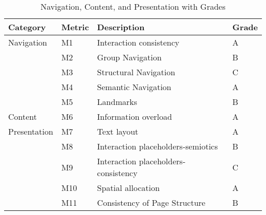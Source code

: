 \begin{table}[ht]
	\centering
	\caption{Navigation, Content, and Presentation with Grades}
	\begin{tabular}{|l|l|l|l|}
		\hline
		\textbf{Category} & \textbf{Metric} & \textbf{Description} & \textbf{Grade} \\
		\hline
		Navigation & M1 & Interaction consistency & A \\
		\hline
		& M2 & Group Navigation & B \\
		\hline
		& M3 & Structural Navigation & C \\
		\hline
		& M4 & Semantic Navigation & A \\
		\hline
		& M5 & Landmarks & B \\
		\hline
		Content    & M6 & Information overload & A \\
		\hline
		Presentation & M7 & Text layout & A \\
		\hline
		& M8 & Interaction placeholders-semiotics & B \\
		\hline
		& M9 & Interaction placeholders-consistency & C \\
		\hline
		& M10 & Spatial allocation & A \\
		\hline
		& M11 & Consistency of Page Structure & B \\
		\hline
	\end{tabular}
\end{table}
